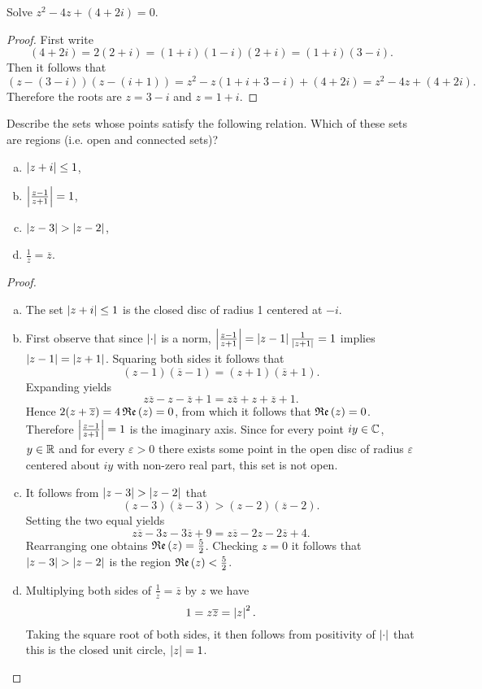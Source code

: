 \documentclass[12pt]{amsart}
\begin{document}
\begin{thm}
  Solve $z^2 - 4z + (4 + 2i) = 0$.
  \begin{proof}
    First write
    $$(4 + 2i) = 2(2 + i) = (1 + i)(1 - i)(2 + i) = (1 + i)(3 - i).$$
    Then it follows that 
    $$(z - (3 - i))(z - (i + 1)) = z^2 - z(1 + i + 3 - i) + (4 + 2i) = z^2 - 4z + (4 + 2i).$$
    Therefore the roots are $z = 3 - i$ and $z = 1 + i$.
  \end{proof}
\end{thm}

\begin{thm}
  Describe the sets whose points satisfy the following relation.
  Which of these sets are regions (i.e. open and connected sets)?
  \begin{enumerate}[(a)]
  \item
    $\left| z + i \right| \leq 1$,
  \item
    $\left| \frac{z - 1}{z + 1} \right| = 1$,
  \item
    $\left| z - 3 \right| > \left| z - 2 \right|$,
  \item
    $\frac{1}{z} = \overline{z}$.
  \end{enumerate}
  \begin{proof}
    \begin{enumerate}[(a)]
    \item
      The set $\left| z + i \right| \leq 1$ is the closed disc of radius 1 centered at $-i$.
    \item
      First observe that since $\left| \cdot \right|$ is a norm,  $\left| \frac{z - 1}{z + 1} \right| = \left| z - 1 \right|\frac{1}{\left| z + 1 \right|} = 1$ implies $\left| z - 1 \right| = \left| z + 1 \right|$.
      Squaring both sides it follows that  $$(z - 1)(\overline{z} - 1) = (z + 1)(\overline{z} + 1).$$
      Expanding yields $$z\overline{z} - z - \overline{z} + 1 = z\overline{z} + z + \overline{z} + 1.$$
      Hence $2(z + \overline{z}) = 4\operatorname{\mathfrak{Re}}\left(z\right) = 0$, from which it follows that $\operatorname{\mathfrak{Re}}\left(z\right) = 0$.
      Therefore $\left| \frac{z - 1}{z + 1} \right| = 1$ is the imaginary axis.
      Since for every point $iy \in \mathbb{C}$, $y \in \mathbb{R}$ and for every $\varepsilon > 0$ there exists some point in the open disc of radius $\varepsilon$ centered about $iy$ with non-zero real part, this set is not open. 
    \item
      It follows from $\left| z - 3 \right| > \left| z - 2 \right|$ that $$(z - 3)(\overline{z} - 3) > (z - 2)(\overline{z} - 2).$$
      Setting the two equal yields 
      $$z\overline{z} - 3z - 3\overline{z} + 9 = z\overline{z} - 2z - 2\overline{z} + 4.$$
      Rearranging one obtains $\operatorname{\mathfrak{Re}}\left(z\right) = \frac{5}{2}$.
      Checking $z = 0$ it follows that $\left| z - 3 \right| > \left| z - 2 \right|$ is the region $\operatorname{\mathfrak{Re}}\left(z\right) < \frac{5}{2}$.
    \item
      Multiplying both sides of $\frac{1}{z} = \overline{z}$ by $z$ we have 
      $$1 = z\overline{z} = \left| z \right|^2.$$
      Taking the square root of both sides, it then follows from positivity of $\left| \cdot \right|$ that this is the closed unit circle, $\left| z \right| = 1$.
    \end{enumerate}
  \end{proof}
\end{thm}
\end{document}
